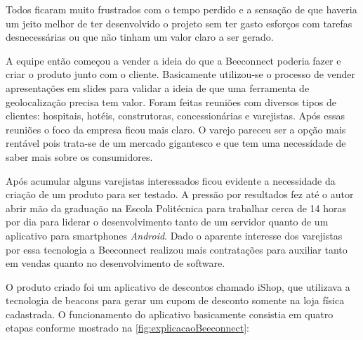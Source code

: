 Todos ficaram muito frustrados com o tempo perdido e a sensação de que haveria um jeito melhor de ter desenvolvido o projeto sem ter gasto esforços com tarefas desnecessárias ou que não tinham um valor claro a ser gerado.

A equipe então começou a vender a ideia do que a Beeconnect poderia fazer e criar o produto junto com o cliente. Basicamente utilizou-se o processo de vender apresentações em slides para validar a ideia de que uma ferramenta de geolocalização precisa tem valor. Foram feitas reuniões com diversos tipos de clientes: hospitais, hotéis, construtoras, concessionárias e varejistas. Após essas reuniões o foco da empresa ficou mais claro. O varejo pareceu ser a opção mais rentável pois trata-se de um mercado gigantesco e que tem uma necessidade de saber mais sobre os consumidores.

Após acumular alguns varejistas interessados ficou evidente a necessidade da criação de um produto para ser testado. A pressão por resultados fez até o autor abrir mão da graduação na Escola Politécnica para trabalhar cerca de 14 horas por dia para liderar o desenvolvimento tanto de um servidor quanto de um aplicativo para smartphones \textit{Android}. Dado o aparente interesse dos varejistas por essa tecnologia a Beeconnect realizou mais contratações para auxiliar tanto em vendas quanto no desenvolvimento de software.

O produto criado foi um aplicativo de descontos chamado iShop, que utilizava a tecnologia de beacons para gerar um cupom de desconto somente na loja física cadastrada. O funcionamento do aplicativo basicamente consistia em quatro etapas conforme mostrado na \autoref{fig:explicacaoBeeconnect}:

